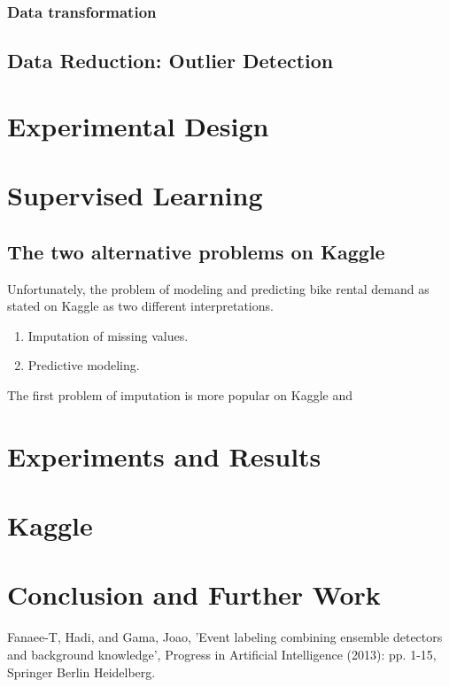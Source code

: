 \documentclass[12pt]{article}
\begin{document}
\subsubsection{Data transformation}

\subsection{Data Reduction: Outlier Detection}






\section{Experimental Design}
\label{sec:experimental-design}



\section{Supervised Learning}
\label{supervised learning}

\subsection{The two alternative problems on Kaggle}

Unfortunately, the problem of modeling and predicting bike rental demand as stated on Kaggle as two different interpretations.

\begin{enumerate}
	\item Imputation of missing values.
	\item Predictive modeling.
\end{enumerate}

The first problem of imputation is more popular on Kaggle and 

\section{Experiments and Results}
\label{sec:experiments-and-results}

\section{Kaggle}


\section{Conclusion and Further Work}
\label{sec:conclusion}



\begin{thebibliography}{9}
Fanaee-T, Hadi, and Gama, Joao, 'Event labeling combining ensemble detectors and background knowledge', Progress in Artificial Intelligence (2013): pp. 1-15, Springer Berlin Heidelberg.
\end{thebibliography}
\end{document}
